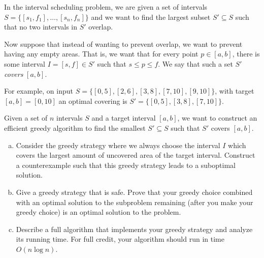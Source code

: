 \documentclass[11pt]{article}
\begin{document}
    \begin{tcolorbox}[title={Problem 2 (Min Interval Scheduling, 35 pts)}] \setlength\parindent{1em}
        In the interval scheduling problem, we are given a set of intervals $S=\{[s_1, f_1],\dots,[s_n,f_n]\}$ and we want to find the largest subset $S'\subseteq S$ such that no two intervals in $S'$ overlap. 

        Now suppose that instead of wanting to prevent overlap, we want to prevent having any empty areas. That is, we want that for every point $p \in [a, b]$, there is some interval $I = [s,f] \in S'$ such that $s \leq p \leq f$. We say that such a set $S'$ \emph{covers} $[a,b]$.
        
        For example, on input $S = \{[0,5], [2,6], [3, 8], [7, 10], [9, 10]\}$, with target $[a,b] = [0, 10]$ an optimal covering is $S' = \{[0,5], [3,8], [7, 10]\}$.
        
        Given a set of $n$ intervals $S$ and a target interval $[a,b]$, we want to construct an efficient greedy algorithm to find the smallest $S' \subseteq S$ such that $S'$ covers $[a,b]$.
        
        \begin{enumerate}[(a)]
            \item Consider the greedy strategy where we always choose the interval $I$ which covers the largest amount of uncovered area of the target interval. Construct a counterexample such that this greedy strategy leads to a suboptimal solution.
            \item Give a greedy strategy that is safe. Prove that your greedy choice combined with an optimal solution to the subproblem remaining (after you make your greedy choice) is an optimal solution to the problem.
            \item Describe a full algorithm that implements your greedy strategy and analyze its running time. For full credit, your algorithm should run in time $O(n\log n)$.
        \end{enumerate}
    \end{tcolorbox}

    
    \newpage
\end{document}
